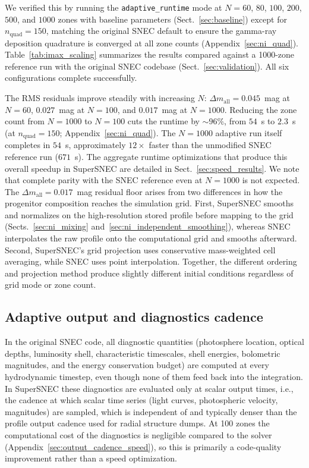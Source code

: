 \documentclass[twocolumn,linenumbers]{aastex701}
\begin{document}
We verified this by running the \texttt{adaptive\_\-runtime} mode at $N = 60$, $80$, $100$, $200$, $500$, and $1000$ zones with baseline parameters (Sect.~\ref{sec:baseline}) except for $n_\mathrm{quad} = 150$, matching the original SNEC default to ensure the gamma-ray deposition quadrature is converged at all zone counts (Appendix~\ref{sec:ni_quad}). Table~\ref{tab:imax_scaling} summarizes the results compared against a 1000-zone reference run with the original SNEC codebase (Sect.~\ref{sec:validation}). All six configurations complete successfully.



The RMS residuals improve steadily with increasing $N$: $\Delta m_\mathrm{all} = 0.045$~mag at $N = 60$, $0.027$~mag at $N = 100$, and $0.017$~mag at $N = 1000$. Reducing the zone count from $N = 1000$ to $N = 100$ cuts the runtime by ${\sim}96\%$, from $54$~s to $2.3$~s (at $n_\mathrm{quad}=150$; Appendix~\ref{sec:ni_quad}). The $N = 1000$ adaptive run itself completes in $54$~s, approximately $12\times$ faster than the unmodified SNEC reference run ($671$~s). The aggregate runtime optimizations that produce this overall speedup in SuperSNEC are detailed in Sect.~\ref{sec:speed_results}. We note that complete parity with the SNEC reference even at $N = 1000$ is not expected. The $\Delta m_\mathrm{all} = 0.017$~mag residual floor arises from two differences in how the progenitor composition reaches the simulation grid. First, SuperSNEC smooths and normalizes on the high-resolution stored profile before mapping to the grid (Sects.~\ref{sec:ni_mixing} and~\ref{sec:ni_independent_smoothing}), whereas SNEC interpolates the raw profile onto the computational grid and smooths afterward. Second, SuperSNEC's grid projection uses conservative mass-weighted cell averaging, while SNEC uses point interpolation. Together, the different ordering and projection method produce slightly different initial conditions regardless of grid mode or zone count.

\subsection{Adaptive output and diagnostics cadence}
\label{sec:cadence}

In the original SNEC code, all diagnostic quantities (photosphere location, optical depths, luminosity shell, characteristic timescales, shell energies, bolometric magnitudes, and the energy conservation budget) are computed at every hydrodynamic timestep, even though none of them feed back into the integration. In SuperSNEC these diagnostics are evaluated only at scalar output times, i.e., the cadence at which scalar time series (light curves, photospheric velocity, magnitudes) are sampled, which is independent of and typically denser than the profile output cadence used for radial structure dumps. At 100 zones the computational cost of the diagnostics is negligible compared to the solver (Appendix~\ref{sec:output_cadence_speed}), so this is primarily a code-quality improvement rather than a speed optimization.
\end{document}
